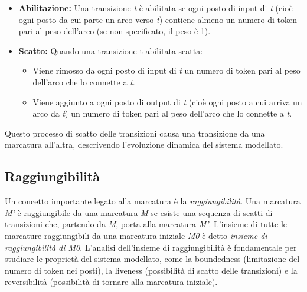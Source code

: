 \begin{itemize}
    \item \textbf{Abilitazione:} Una transizione \textit{t} è abilitata se ogni posto di input di \textit{t} (cioè ogni posto da cui parte un arco verso \textit{t}) contiene almeno un numero di token pari al peso dell'arco (se non specificato, il peso è 1).
    \item \textbf{Scatto:} Quando una transizione t abilitata scatta: 
    \begin{itemize}
        \item Viene rimosso da ogni posto di input di \textit{t} un numero di token pari al peso dell'arco che lo connette a \textit{t}.
        \item Viene aggiunto a ogni posto di output di \textit{t} (cioè ogni posto a cui arriva un arco da \textit{t}) un numero di token pari al peso dell'arco che lo connette a \textit{t}.
    \end{itemize}
\end{itemize}

Questo processo di scatto delle transizioni causa una transizione da una marcatura all'altra, descrivendo l'evoluzione dinamica del sistema modellato.

\subsection{Raggiungibilità}
Un concetto importante legato alla marcatura è la \textit{raggiungibilità}. Una marcatura \textit{M'} è raggiungibile da una marcatura \textit{M} se esiste una sequenza di scatti di transizioni che, partendo da \textit{M}, porta alla marcatura \textit{M'}. L'insieme di tutte le marcature raggiungibili da una marcatura iniziale \textit{M0} è detto \textit{insieme di raggiungibilità di M0}. L'analisi dell'insieme di raggiungibilità è fondamentale per studiare le proprietà del sistema modellato, come la boundedness (limitazione del numero di token nei posti), la liveness (possibilità di scatto delle transizioni) e la reversibilità (possibilità di tornare alla marcatura iniziale).